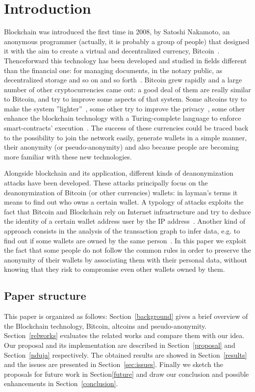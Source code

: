 \section{Introduction}
Blockchain was introduced the first time in 2008, by Satoshi Nakamoto, an
anonymous programmer (actually, it is probably a group of people) that
designed it with the aim to create a virtual and decentralized currency,
Bitcoin~\cite{bib:satoshi}.
Thenceforward this technology has been developed and
studied in fields different than the financial one: for managing documents, in
the notary public, as decentralized storage and so on and so
forth~\cite{bib:air}. Bitcoin grew
rapidly and a large number of other cryptocurrencies came out:
a good deal of them are really
similar to Bitcoin, and try to improve some aspects of that system. Some
altcoins try to make the system ''lighter''~\cite{bib:litecoin:wiki},
some other try to improve the privacy~\cite{bib:zerocoin:white_paper,
bib:zerocash:white_paper,
bib:monero:white_paper}, some other enhance the blockchain technology with a
Turing-complete language to enforce smart-contracts'
execution~\cite{bib:ethereum:whitepaper}.
The success of these
currencies could be traced back to the possibility to join the network easily,
generate wallets in a simple manner,
their anonymity (or pseudo-anonymity) and also because people are
becoming more familiar with these new technologies.


Alongside blockchain and its application, different kinds of deanonymization
attacks have been developed.
These attacks principally focus on the
deanonymization of Bitcoin (or other currencies) wallets: in layman's terms
it means to find out who owns a certain wallet.
A typology of attacks exploits the fact that Bitcoin and Blockchain rely
on Internet infrastructure and try to deduce the identity of a certain wallet
address user by the IP address~\cite{bib:deanon}.
Another kind of approach consists in the analysis of the transaction graph
to infer data, e.g. to find out if some wallets are owned by the same
person~\cite{bib:fistful}.
In this paper we exploit the fact that some people do not follow the common
rules in order to preserve the anonymity of their wallets by associating them
with their personal data, without knowing that they risk to compromise even
other wallets owned by them.


\subsection{Paper structure}
This paper is organized as follows: Section~\ref{background} gives a brief
overview of the Blockchain technology, Bitcoin, altcoins and pseudo-anonymity.
Section~\ref{relworks} evaluates the related works and compare them
with our idea. Our proposal and its implementation are described
in Section~\ref{proposal} and Section~\ref{nduja} respectively.
The obtained results are showed in Section~\ref{results} and the issues
are presented in Section~\ref{sec:issues}. 
Finally we sketch the proposals for future work in Section\ref{future} and draw
our conclusion and possible enhancements in Section~\ref{conclusion}.
